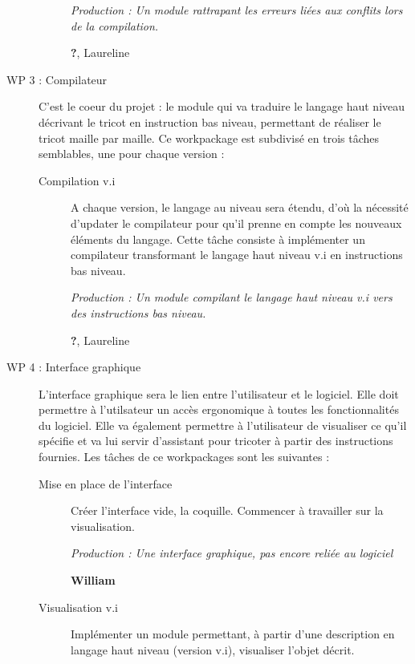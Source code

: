 \documentclass{article}
\begin{document}
\begin{description}
\begin{description}
      \textit{Production : Un module rattrapant les erreurs liées aux conflits lors de la compilation.}
      
      \textbf{?}, Laureline
    \end{description}

\medskip

\item[WP 3 : Compilateur] C'est le coeur du projet : le module qui va traduire le langage haut niveau décrivant le tricot en instruction bas niveau, permettant de réaliser le tricot maille par maille. Ce workpackage est subdivisé en trois tâches semblables, une pour chaque version :

    \begin{description}
    \item[Compilation v.i] A chaque version, le langage au niveau sera étendu, d'où la nécessité d'updater le compilateur pour qu'il prenne en compte les nouveaux éléments du langage. Cette tâche consiste à implémenter un compilateur transformant le langage haut niveau v.i en instructions bas niveau. 
      
      \textit{Production : Un module compilant le langage haut niveau v.i vers des instructions bas niveau.}
      
      \textbf{?}, Laureline %
    \end{description}

\medskip

\item[WP 4 : Interface graphique] L'interface graphique sera le lien entre l'utilisateur et le logiciel. Elle doit permettre à l'utilsateur un accès ergonomique à toutes les fonctionnalités du logiciel. Elle va également permettre à l'utilisateur de visualiser ce qu'il spécifie et va lui servir d'assistant pour tricoter à partir des instructions fournies. Les tâches de ce workpackages sont les suivantes :

  \begin{description}
  \item[Mise en place de l'interface] Créer l'interface vide, la coquille. Commencer à travailler sur la visualisation.
    
    \textit{Production : Une interface graphique, pas encore reliée au logiciel}
    
    \textbf{William}

  \item[Visualisation v.i] Implémenter un module permettant, à partir d'une description en langage haut niveau (version v.i), visualiser l'objet décrit.
    

\end{description}
\end{description}
\end{document}
